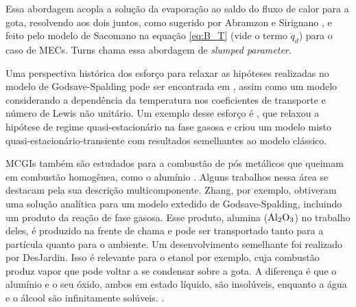 Essa abordagem acopla a solução da evaporação ao saldo do fluxo de calor para a gota, resolvendo aos dois juntos, como sugerido por Abramzon e Sirignano \cite{Sirignano1989}, e feito pelo modelo de Sacomano\etal \cite{SacomanoF2022IJHMT} na equação \eqref{eq:B_T} (vide o termo $\dot q_d$) para o caso de MECs.
Turns \cite{Turns2000} chama essa abordagem de \emph{slumped parameter.}

Uma perspectiva histórica dos esforço para relaxar as hipóteses realizadas no modelo de Godsave-Spalding pode ser encontrada em \cite{FachiniF1999}, assim como um modelo considerando a dependência da temperatura nos coeficientes de transporte e número de Lewis não unitário.
Um exemplo desse esforço é , que relaxou a hipótese de regime quasi-estacionário na fase gasosa e criou um modelo misto quasi-estacionário-transiente com resultados semelhantes ao modelo clássico.

MCGIs também são estudados para a combustão de pós metálicos que queimam em combustão homogênea, como o alumínio \cite[p. 7]{Bergthorson2015}.
Alguns trabalhos nessa área se destacam pela sua descrição multicomponente. 
Zhang\etal \cite{Zhang2022_Coflow,Zhang2022_Counterflow}, por exemplo, obtiveram uma solução analítica para um modelo extedido de Godsave-Spalding, incluindo um produto da reação de fase gasosa.
Esse produto, alumina ($\mathrm{Al}_2 \mathrm{O}_3$) no trabalho deles, é produzido na frente de chama e pode ser transportado tanto para a partícula quanto para o ambiente.
Um desenvolvimento semelhante foi realizado por DesJardin\etal \cite{DesJardin2005}.
Isso é relevante para o etanol por exemplo, cuja combustão produz vapor que pode voltar a se condensar sobre a gota.
A diferença é que o alumínio e o seu óxido, ambos em estado líquido, são insolúveis, enquanto a água e o álcool são infinitamente solúveis. \source{}.



